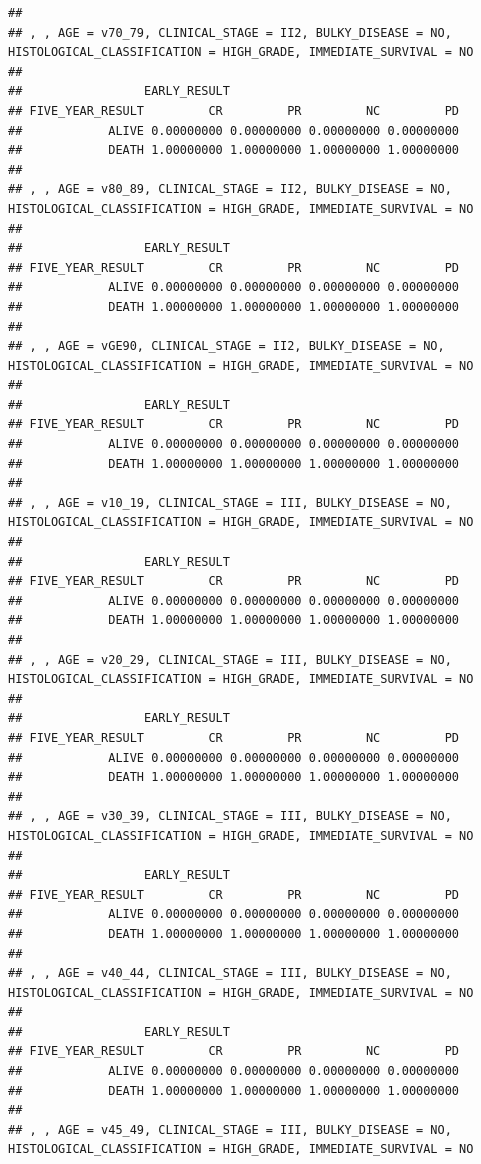 \documentclass[]{article}
\begin{document}
\begin{verbatim}
## 
## , , AGE = v70_79, CLINICAL_STAGE = II2, BULKY_DISEASE = NO, HISTOLOGICAL_CLASSIFICATION = HIGH_GRADE, IMMEDIATE_SURVIVAL = NO
## 
##                 EARLY_RESULT
## FIVE_YEAR_RESULT         CR         PR         NC         PD
##            ALIVE 0.00000000 0.00000000 0.00000000 0.00000000
##            DEATH 1.00000000 1.00000000 1.00000000 1.00000000
## 
## , , AGE = v80_89, CLINICAL_STAGE = II2, BULKY_DISEASE = NO, HISTOLOGICAL_CLASSIFICATION = HIGH_GRADE, IMMEDIATE_SURVIVAL = NO
## 
##                 EARLY_RESULT
## FIVE_YEAR_RESULT         CR         PR         NC         PD
##            ALIVE 0.00000000 0.00000000 0.00000000 0.00000000
##            DEATH 1.00000000 1.00000000 1.00000000 1.00000000
## 
## , , AGE = vGE90, CLINICAL_STAGE = II2, BULKY_DISEASE = NO, HISTOLOGICAL_CLASSIFICATION = HIGH_GRADE, IMMEDIATE_SURVIVAL = NO
## 
##                 EARLY_RESULT
## FIVE_YEAR_RESULT         CR         PR         NC         PD
##            ALIVE 0.00000000 0.00000000 0.00000000 0.00000000
##            DEATH 1.00000000 1.00000000 1.00000000 1.00000000
## 
## , , AGE = v10_19, CLINICAL_STAGE = III, BULKY_DISEASE = NO, HISTOLOGICAL_CLASSIFICATION = HIGH_GRADE, IMMEDIATE_SURVIVAL = NO
## 
##                 EARLY_RESULT
## FIVE_YEAR_RESULT         CR         PR         NC         PD
##            ALIVE 0.00000000 0.00000000 0.00000000 0.00000000
##            DEATH 1.00000000 1.00000000 1.00000000 1.00000000
## 
## , , AGE = v20_29, CLINICAL_STAGE = III, BULKY_DISEASE = NO, HISTOLOGICAL_CLASSIFICATION = HIGH_GRADE, IMMEDIATE_SURVIVAL = NO
## 
##                 EARLY_RESULT
## FIVE_YEAR_RESULT         CR         PR         NC         PD
##            ALIVE 0.00000000 0.00000000 0.00000000 0.00000000
##            DEATH 1.00000000 1.00000000 1.00000000 1.00000000
## 
## , , AGE = v30_39, CLINICAL_STAGE = III, BULKY_DISEASE = NO, HISTOLOGICAL_CLASSIFICATION = HIGH_GRADE, IMMEDIATE_SURVIVAL = NO
## 
##                 EARLY_RESULT
## FIVE_YEAR_RESULT         CR         PR         NC         PD
##            ALIVE 0.00000000 0.00000000 0.00000000 0.00000000
##            DEATH 1.00000000 1.00000000 1.00000000 1.00000000
## 
## , , AGE = v40_44, CLINICAL_STAGE = III, BULKY_DISEASE = NO, HISTOLOGICAL_CLASSIFICATION = HIGH_GRADE, IMMEDIATE_SURVIVAL = NO
## 
##                 EARLY_RESULT
## FIVE_YEAR_RESULT         CR         PR         NC         PD
##            ALIVE 0.00000000 0.00000000 0.00000000 0.00000000
##            DEATH 1.00000000 1.00000000 1.00000000 1.00000000
## 
## , , AGE = v45_49, CLINICAL_STAGE = III, BULKY_DISEASE = NO, HISTOLOGICAL_CLASSIFICATION = HIGH_GRADE, IMMEDIATE_SURVIVAL = NO

\end{verbatim}
\end{document}
